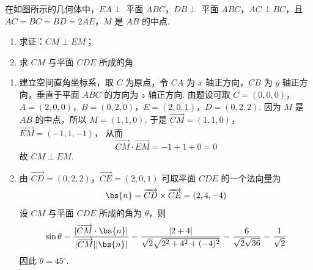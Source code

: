 \begin{problem}
在如图所示的几何体中，\(EA \perp\) 平面 \(ABC\)，\(DB \perp\) 平面 \(ABC\)，\(AC \perp BC\)，且 \(AC = BC = BD = 2AE\)，\(M\) 是 \(AB\) 的中点.

\begin{enumerate}
\item 求证：\(CM \perp EM\)；
\item 求 \(CM\) 与平面 \(CDE\) 所成的角.
\end{enumerate}


\begin{solution}
\begin{enumerate}
\item 建立空间直角坐标系，取 \(C\) 为原点，令 \(CA\) 为 \(x\) 轴正方向，\(CB\) 为 \(y\) 轴正方向，垂直于平面 \(ABC\) 的方向为 \(z\) 轴正方向. 由题设可取
\(C=(0,0,0)\)，\(A=(2,0,0)\)，\(B=(0,2,0)\)，\(E=(2,0,1)\)，\(D=(0,2,2)\).
因为 \(M\) 是 \(AB\) 的中点，所以 \(M=(1,1,0)\). 于是
\(\overrightarrow{CM}=(1,1,0)\)，\(\overrightarrow{EM}=(-1,1,-1)\)，
从而
\[
\overrightarrow{CM}\cdot\overrightarrow{EM}=-1+1+0=0
\]
故 \(CM\perp EM\).
\item 由
\(\overrightarrow{CD}=(0,2,2)\)，\(\overrightarrow{CE}=(2,0,1)\)
可取平面 \(CDE\) 的一个法向量为
\[
\bs{n}=\overrightarrow{CD}\times\overrightarrow{CE}=(2,4,-4)
\]
设 \(CM\) 与平面 \(CDE\) 所成的角为 \(\theta\)，则
\[
\sin\theta
=\frac{\lvert\overrightarrow{CM}\cdot\bs{n}\rvert}{\lvert\overrightarrow{CM}\rvert\lvert\bs{n}\rvert}
=\frac{\lvert2+4\rvert}{\sqrt2\sqrt{2^2+4^2+(-4)^2}}
=\frac6{\sqrt2\sqrt{36}}
=\frac1{\sqrt2}
\]
因此 \(\theta=45^{\circ}\).
\end{enumerate}
\end{solution}
\end{problem}

